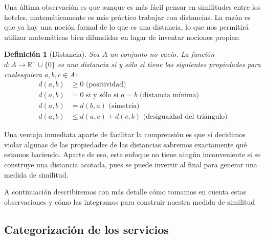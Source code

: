 \documentclass[12pt]{report}
\newtheorem{defn}{Definici\'on}[chapter]
\begin{document}
Una última observación es que aunque es más fácil pensar en similitudes entre los hoteles, matemáticamente es más práctico trabajar con distancias. La razón es que ya hay una noción formal de lo que es una distancia, lo que nos permitirá utilizar matemáticas bien difundidas en lugar de inventar nociones propias:
\begin{defn}[Distancia]
Sea $A$ un conjunto no vacío. La función $d: A \to \mathbb{R}^+ \cup \{0\}$ es una distancia si y sólo si tiene las siguientes propiedades para cualesquiera $a, b, c \in A$:
\begin{align}
	d(a,b) &\geq 0 \text{ (positividad)}\label{dpos}\\
	d(a,b) &= 0 \text{ si y sólo si } a = b \text{ (distancia mínima)}\label{dmin}\\
	d(a,b) &= d(b,a) \text{ (simetría)}\label{dsim}\\
	d(a,b) &\leq d(a,c) + d(c,b) \text{ (desigualdad del triángulo)}\label{dtri}
\end{align}
\end{defn}
Una ventaja inmediata aparte de facilitar la comprensión es que si decidimos violar algunas de las propiedades de las distancias sabremos exactamente qué estamos haciendo. Aparte de eso, este enfoque no tiene ningún inconveniente si se construye una distancia acotada, pues se puede invertir al final para generar una medida de similitud. 

A continuación describiremos con más detalle cómo tomamos en cuenta estas observaciones y cómo las integramos para construir nuestra medida de similitud

\subsection*{Categorización de los servicios}
\end{document}
